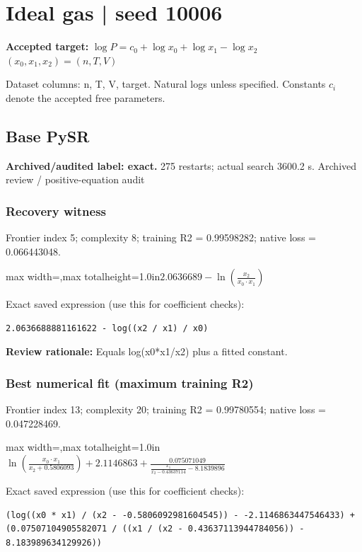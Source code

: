 \documentclass[10pt,letterpaper,landscape]{article}
\begin{document}
\section*{Ideal gas | seed 10006}
\textbf{Accepted target:} $\displaystyle \log P=c_0+\log x_0+\log x_1-\log x_2$\hfill $(x_0,x_1,x_2)=(n,T,V)$\par
{\small Dataset columns: n, T, V, target. Natural logs unless specified. Constants $c_i$ denote the accepted free parameters.}\par\medskip
\begin{minipage}[t]{0.485\textwidth}
\subsection*{Base PySR}
\textbf{Archived/audited label: exact.} 275 restarts; actual search 3600.2 s.
{\small Archived review / positive-equation audit}
\subsubsection*{Recovery witness}
Frontier index 5; complexity 8; training R2 = 0.99598282; native loss = 0.066443048.
\begin{center}\begin{adjustbox}{max width=\linewidth,max totalheight=1.0in}$\displaystyle 2.0636689 - \ln{\left(\frac{x_{2}}{x_{0} \cdot x_{1}} \right)}$\end{adjustbox}\end{center}
{\scriptsize Exact saved expression (use this for coefficient checks):}
\begin{lstlisting}
2.0636688881161622 - log((x2 / x1) / x0)
\end{lstlisting}
{\small\textbf{Review rationale:} Equals log(x0*x1/x2) plus a fitted constant.}
\subsubsection*{Best numerical fit (maximum training R2)}
Frontier index 13; complexity 20; training R2 = 0.99780554; native loss = 0.047228469.
\begin{center}\begin{adjustbox}{max width=\linewidth,max totalheight=1.0in}$\displaystyle \ln{\left(\frac{x_{0} \cdot x_{1}}{x_{2} + 0.5806093} \right)} + 2.1146863 + \frac{0.075071049}{\frac{x_{1}}{x_{2} - 0.43637114} - 8.1839896}$\end{adjustbox}\end{center}
{\scriptsize Exact saved expression (use this for coefficient checks):}
\begin{lstlisting}
(log((x0 * x1) / (x2 - -0.5806092981604545)) - -2.1146863447546433) + (0.07507104905582071 / ((x1 / (x2 - 0.43637113944784056)) - 8.183989634129926))
\end{lstlisting}
\end{minipage}\hfill
\end{document}
